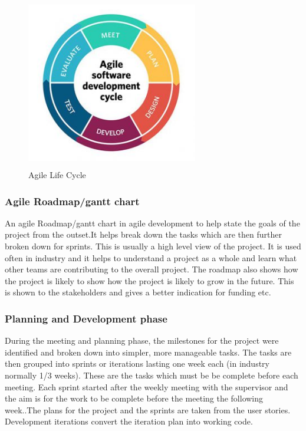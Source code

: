 \begin{figure}[ht!]
    \centering
 \includegraphics[width=75mm, height=75mm,scale=0.5]{img/agile.jpg}
\caption{Agile Life Cycle}
\label{fig:agile}
\end{figure}

\subsubsection{Agile Roadmap/gantt chart}
An agile Roadmap/gantt chart in agile development to help state the goals of the project from the outset.It helps break down the tasks which are then further broken down for sprints. This is usually a high level view of the project.\cite{testPlan} It is used often in industry and it helps to understand a project as a whole and learn what other teams are contributing to the overall project. The roadmap also shows how the project is likely to show how the project is likely to grow in the future. This is shown to the stakeholders and gives a better indication for funding etc.\cite{roadmap_2016}

\subsubsection{Planning and Development phase}
During the meeting and planning phase, the milestones for the project were identified and broken down into simpler, more manageable tasks. The tasks are then grouped into sprints or iterations lasting one week each (in industry normally 1/3 weeks). These are the tasks which must be be complete before each meeting. Each sprint started after the weekly meeting with the supervisor and the aim is for the work to be complete before the meeting the following week.\cite{Agile}.The plans for the project and the sprints are taken from the user stories. Development iterations convert the iteration plan into working code.\cite{agile_process}

